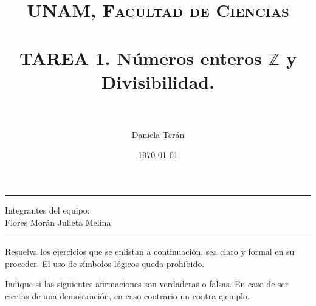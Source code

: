 \documentclass[fontsize=12pt]{scrartcl}
\title{	
	\normalfont \normalsize 
	\textsc{UNAM, Facultad de Ciencias} \\ [25pt] 
	\horrule{0.5pt} \\[0.4cm] 
	\huge TAREA 1. N\'umeros enteros $\mathbb{Z}$ y Divisibilidad.\\ 
	\horrule{2pt} \\[0.5cm] 
}
\author{Daniela Ter\'an}
\date{\normalsize\today}
\begin{document}
	
	
	
	
\maketitle
\begin{center}
		\noindent\rule{\textwidth}{1pt}
		Integrantes del equipo:\\
		Flores Morán Julieta Melina\\
%		
		\noindent\rule{\textwidth}{1pt}  
\end{center}

	Resuelva los ejercicios que se enlistan a continuaci\'on, sea claro y formal 
	en su proceder. El uso de s\'imbolos l\'ogicos queda prohibido.
		
	Indique si las siguientes afirmaciones son verdaderas o falsas. En caso de 
	ser ciertas de una demostraci\'on, en caso contrario un contra ejemplo.
	
\end{document}
